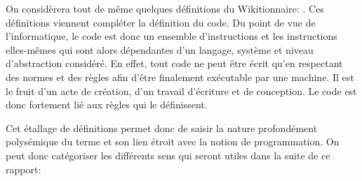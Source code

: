 \documentclass[12pt]{article} %
\begin{document}
On considèrera tout de même quelques définitions du Wikitionnaire:
\cite{noauthor_undated-vw}. Ces définitions viennent compléter la définition du code. Du point de vue de l'informatique, le code est donc un ensemble d'instructions et les instructions elles-mêmes qui sont alors dépendantes d'un langage, système et niveau d'abstraction considéré. En effet, tout code ne peut être écrit qu'en respectant des normes et des règles afin d'être finalement exécutable par une machine. Il est le fruit d'un acte de création, d'un travail d'écriture et de conception. Le code est donc fortement lié aux règles qui le définissent. 

Cet étallage de définitions permet donc de saisir la nature profondément polysémique du terme et son lien étroit avec la notion de programmation. On peut donc catégoriser les différents sens qui seront utiles dans la suite de ce rapport:
\end{document}

